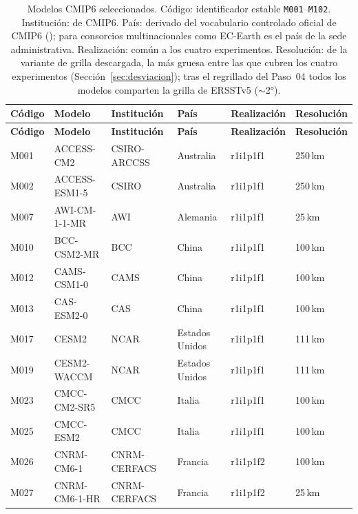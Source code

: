 \begingroup\small
\begin{longtable}{@{}L{1.3cm}L{2.9cm}L{3.5cm}L{2.5cm}L{2.1cm}L{\dimexpr\textwidth-12.3cm-10\tabcolsep\relax}@{}}
\caption[Modelos CMIP6 seleccionados: código, institución, país, realización y resolución nominal.]{Modelos CMIP6 seleccionados. Código: identificador estable \texttt{M001}--\texttt{M102}. Institución:  de CMIP6. País: derivado del vocabulario controlado oficial de CMIP6 (); para consorcios multinacionales como EC-Earth es el país de la sede administrativa. Realización:  común a los cuatro experimentos. Resolución:  de la variante de grilla descargada, la más gruesa entre las que cubren los cuatro experimentos (Sección~\ref{sec:desviacion}); tras el regrillado del Paso~04 todos los modelos comparten la grilla de ERSSTv5 ($\sim$2°).}
\label{tab:modelos} \\
\toprule
\textbf{Código} & \textbf{Modelo} & \textbf{Institución} & \textbf{País} & \textbf{Realización} & \textbf{Resolución} \\
\midrule
\endfirsthead
\toprule
\textbf{Código} & \textbf{Modelo} & \textbf{Institución} & \textbf{País} & \textbf{Realización} & \textbf{Resolución} \\
\midrule
\endhead
\bottomrule
\endfoot
M001 & ACCESS-CM2 & CSIRO-ARCCSS & Australia & r1i1p1f1 & 250\,km \\
M002 & ACCESS-ESM1-5 & CSIRO & Australia & r1i1p1f1 & 250\,km \\
M007 & AWI-CM-1-1-MR & AWI & Alemania & r1i1p1f1 & 25\,km \\
M010 & BCC-CSM2-MR & BCC & China & r1i1p1f1 & 100\,km \\
M012 & CAMS-CSM1-0 & CAMS & China & r1i1p1f1 & 100\,km \\
M013 & CAS-ESM2-0 & CAS & China & r1i1p1f1 & 100\,km \\
M017 & CESM2 & NCAR & Estados Unidos & r1i1p1f1 & 111\,km \\
M019 & CESM2-WACCM & NCAR & Estados Unidos & r1i1p1f1 & 111\,km \\
M023 & CMCC-CM2-SR5 & CMCC & Italia & r1i1p1f1 & 100\,km \\
M025 & CMCC-ESM2 & CMCC & Italia & r1i1p1f1 & 100\,km \\
M026 & CNRM-CM6-1 & CNRM-CERFACS & Francia & r1i1p1f2 & 100\,km \\
M027 & CNRM-CM6-1-HR & CNRM-CERFACS & Francia & r1i1p1f2 & 25\,km \\

\end{longtable}
